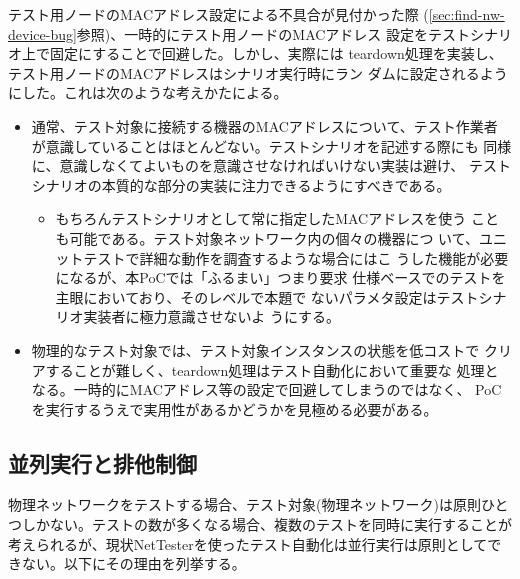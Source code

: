 テスト用ノードのMACアドレス設定による不具合が見付かった際
(\ref{sec:find-nw-device-bug}参照)、一時的にテスト用ノードのMACアドレス
設定をテストシナリオ上で固定にすることで回避した。しかし、実際には
teardown処理を実装し、テスト用ノードのMACアドレスはシナリオ実行時にラン
ダムに設定されるようにした。これは次のような考えかたによる。
\begin{itemize}
 \item 通常、テスト対象に接続する機器のMACアドレスについて、テスト作業者
       が意識していることはほとんどない。テストシナリオを記述する際にも
       同様に、意識しなくてよいものを意識させなければいけない実装は避け、
       テストシナリオの本質的な部分の実装に注力できるようにすべきである。
       \begin{itemize}
        \item もちろんテストシナリオとして常に指定したMACアドレスを使う
              ことも可能である。テスト対象ネットワーク内の個々の機器につ
              いて、ユニットテストで詳細な動作を調査するような場合にはこ
              うした機能が必要になるが、本PoCでは「ふるまい」つまり要求
              仕様ベースでのテストを主眼においており、そのレベルで本題で
              ないパラメタ設定はテストシナリオ実装者に極力意識させないよ
              うにする。
       \end{itemize}
 \item 物理的なテスト対象では、テスト対象インスタンスの状態を低コストで
       クリアすることが難しく、teardown処理はテスト自動化において重要な
       処理となる。一時的にMACアドレス等の設定で回避してしまうのではなく、
       PoCを実行するうえで実用性があるかどうかを見極める必要がある。
\end{itemize}

\subsection{並列実行と排他制御}

物理ネットワークをテストする場合、テスト対象(物理ネットワーク)は原則ひと
つしかない。テストの数が多くなる場合、複数のテストを同時に実行することが
考えられるが、現状NetTesterを使ったテスト自動化は並行実行は原則としてで
きない。以下にその理由を列挙する。

